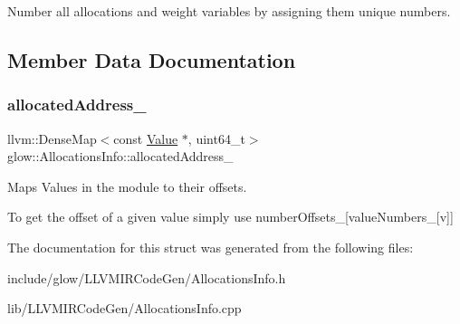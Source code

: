 Number all allocations and weight variables by assigning them unique numbers. 

\subsection{Member Data Documentation}
\mbox{\label{structglow_1_1_allocations_info_a7b605a7c7f6ed12f2c3f6f7e41d2784d}} 
\subsubsection{\texorpdfstring{allocated\+Address\+\_\+}{allocatedAddress\_}}
{\footnotesize\ttfamily llvm\+::\+Dense\+Map$<$const \hyperlink{classglow_1_1_value}{Value} $\ast$, uint64\+\_\+t$>$ glow\+::\+Allocations\+Info\+::allocated\+Address\+\_\+}



Maps Values in the module to their offsets. 

To get the offset of a given value simply use number\+Offsets\+\_\+\mbox{[}value\+Numbers\+\_\+\mbox{[}v\mbox{]}\mbox{]} 

The documentation for this struct was generated from the following files\+:\begin{DoxyCompactItemize}
\item 
include/glow/\+L\+L\+V\+M\+I\+R\+Code\+Gen/Allocations\+Info.\+h\item 
lib/\+L\+L\+V\+M\+I\+R\+Code\+Gen/Allocations\+Info.\+cpp\end{DoxyCompactItemize}
